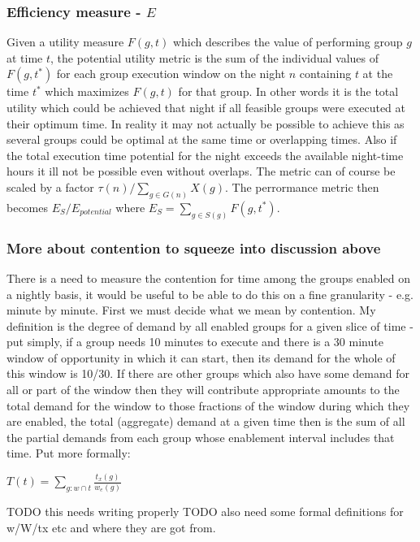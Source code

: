 \subsubsection{Efficiency measure - $E$}
Given a utility measure $F(g,t)$ which describes the value of performing group $g$ at time $t$, the potential utility metric is the sum of the individual values of $F(g,t^*)$ for each group execution window on the night ${n}$ containing $t$ at the time $t^*$ which maximizes  $F(g,t)$ for that group. In other words it is the total utility which could be achieved that night if all feasible groups were executed at their optimum time. In reality it may not actually be possible to achieve this as several groups could be optimal at the same time or overlapping times. Also if the total execution time potential for the night exceeds the available night-time hours it ill not be possible even without overlaps. The metric can of course be scaled by a factor $\tau({n})/\sum_{g \in G{(n)}}{X(g)}$. The perrormance metric then becomes $E_{{S}}/E_{potential}$  where $E_{{S}} = \sum_{g \in {S}(g)}{F(g,t^*)} $. 


\subsubsection{More about contention to squeeze into discussion above}
There is a need to measure the contention for time among the groups enabled on a nightly basis, it would be useful to be able to do this on a fine granularity - e.g. minute by minute. First we must decide what we mean by contention. My definition is the degree of demand by all enabled groups for a given slice of time - put simply, if a group needs 10 minutes to execute and there is a 30 minute window of opportunity in which it can start, then its demand for the whole of this window is 10/30. If there are other groups which also have some demand for all or part of the window then they will contribute appropriate amounts to the total demand for the window to those fractions of the window during which they are enabled, the total (aggregate) demand at a given time then is the sum of all the partial demands from each group whose enablement interval includes that time. Put more formally:

$T(t) = \sum_{g : w \cap t} { \frac{t_x(g)}{w_e(g)} }$ 

TODO this needs writing properly 
TODO also need some formal definitions for w/W/tx etc and where they are got from.

